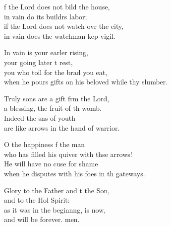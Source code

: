 \settowidth{\versewidth}{when he pours gifts on his beloved while they slumber.}
\begin{psalmverse}%
  \begin{patverse}
f the Lord does not bild the house,\Med\\
in vain do its buildrs labor;\\
if the Lord does not watch ovr the city,\Med\\
in vain does the watchman kep vigil.

In vain is your earl\pointup{\i}er rising,\Med\\
your going later t rest,\\
you who toil for the brad you eat,\Med\\
when he pours gifts on his beloved while thy slumber.

Truly sons are a gift frm the Lord,\Med\\
a blessing, the fruit of th womb.\\
Indeed the sns of youth\Med\\
are like arrows in the hand of  warrior.

O the happiness f the man\Med\\
who has filled his quiver with thse arrows!\\
He will have no cuse for shame\Med\\
when he disputes with his foes in th gateways.

Glory to the Father and t the Son,\Med\\
and to the Hol Spirit:\\
as it was in the beginn\pointup{\i}ng, is now,\Med\\
and will be forever. men. 
  \end{patverse}
\end{psalmverse}
